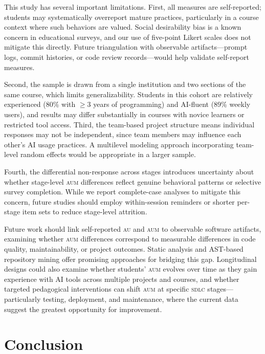 \documentclass[sigconf,anonymous]{acmart}
\newcommand{\AUM}{\textsc{aum}\xspace}
\newcommand{\AU}{\textsc{au}\xspace}
\newcommand{\SDLC}{\textsc{sdlc}\xspace}
\begin{document}
This study has several important limitations. First, all measures are
self-reported; students may systematically overreport mature practices,
particularly in a course context where such behaviors are valued. Social
desirability bias is a known concern in educational surveys, and our use
of five-point Likert scales does not mitigate this directly. Future
triangulation with observable artifacts---prompt logs, commit histories,
or code review records---would help validate self-report measures.

Second, the sample is drawn from a single institution and two sections
of the same course, which limits generalizability. Students in this
cohort are relatively experienced (80\% with $\geq 3$ years of
programming) and AI-fluent (89\% weekly users), and results may differ
substantially in courses with novice learners or restricted tool access.
Third, the team-based project structure means individual responses may
not be independent, since team members may influence each other's AI
usage practices. A multilevel modeling approach incorporating team-level
random effects would be appropriate in a larger sample.

Fourth, the differential non-response across stages introduces
uncertainty about whether stage-level \AUM differences reflect genuine
behavioral patterns or selective survey completion. While we report
complete-case analyses to mitigate this concern, future studies should
employ within-session reminders or shorter per-stage item sets to
reduce stage-level attrition.

Future work should link self-reported \AU and \AUM to observable
software artifacts, examining whether \AUM differences correspond to
measurable differences in code quality, maintainability, or project
outcomes. Static analysis and AST-based repository mining offer
promising approaches for bridging this gap. Longitudinal designs could
also examine whether students' \AUM evolves over time as they gain
experience with AI tools across multiple projects and courses,
and whether targeted pedagogical interventions can shift \AUM at
specific \SDLC stages---particularly testing, deployment, and
maintenance, where the current data suggest the greatest opportunity
for improvement.

\section{Conclusion}
\label{sec:conclusion}
\end{document}
